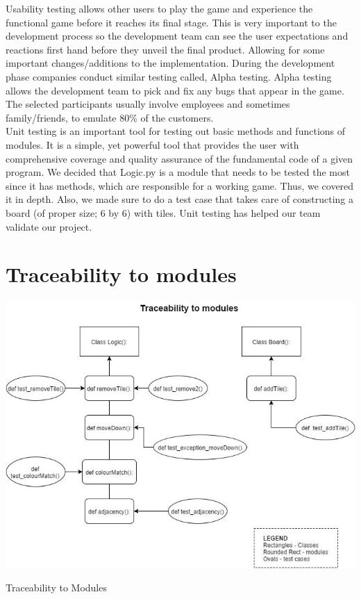 \documentclass[12pt]{article}
\begin{document}
Usability testing allows other users to play the game and experience the functional game before it reaches its final stage. This is very important to the development process so the development team can see the user expectations and reactions first hand before they unveil the final product. Allowing for some important changes/additions to the implementation. During the development phase companies conduct similar testing called, Alpha testing. Alpha testing allows the development team to pick and fix any bugs that appear in the game. The selected participants usually involve employees and sometimes family/friends, to emulate 80\% of the customers.\\
 
Unit testing is an important tool for testing out basic methods and functions of modules. It is a simple, yet powerful tool that provides the user with comprehensive coverage and quality assurance of the fundamental code of a given program. We decided that Logic.py is a module that needs to be tested the most since it has methods, which are responsible for a working game. Thus, we covered it in depth. Also, we made sure to do a test case that takes care of constructing a board (of proper size; 6 by 6) with tiles. Unit testing has helped our team validate our project.


\section{Traceability to modules}
 
\begin{table}[h!]
\includegraphics[width = 17cm]{traceModules}
\caption{Traceability to Modules}
\end{table}
\end{document}
